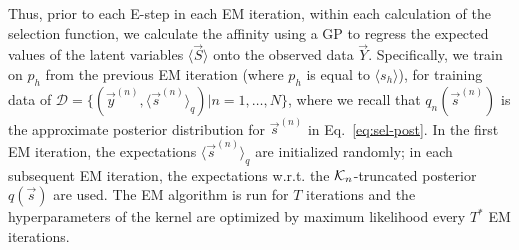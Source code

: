 Thus, prior to each E-step in each EM iteration, within each calculation of the selection function, we calculate the affinity  using a GP to regress the expected values of the latent variables $\langle \vec{S} \rangle$ onto the observed data $\vec{Y}$.  
Specifically, we train on $p_h$ from the previous EM iteration (where $p_h$ is equal to $\langle s_h \rangle$), for 
training data of 
$\mathcal{D} = \{ (\vec{y}^{(n)}, \langle\vec{s}^{(n)}\rangle_{q}) | n = 1,\dots, N \}$, 
where we recall that $q_{n}(\vec{s}^{(n)})$ is the approximate posterior distribution for $\vec{s}^{(n)}$ in Eq.~\eqref{eq:sel-post}.
%
In the first EM iteration, the expectations $\langle\vec{s}^{(n)}\rangle_{q}$ are initialized randomly;
in each subsequent EM iteration, the %
expectations w.r.t. the $\mathcal{K}_{n}$-truncated posterior $q(\vec{s})$ are used. 
The EM algorithm is run for $T$ iterations and the hyperparameters of the kernel are optimized by maximum likelihood every $T^*$ EM iterations.

